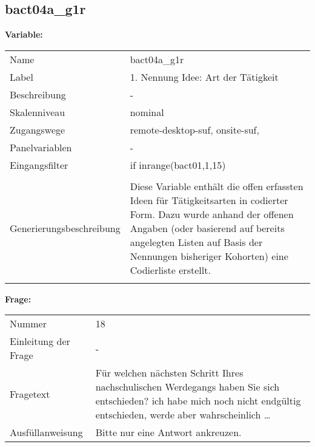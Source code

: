 	
	
	\subsection{bact04a\_g1r}
	\label{subSection:bact04a_g1r}

	\noindent\textbf{Variable:}\\
		\begin{tabular}{lL{11.3cm}}
			\label{tableVariable:bact04a_g1r}
			Name & bact04a\_g1r \\
			Label & 1. Nennung Idee: Art der Tätigkeit \\
			Beschreibung & - \\
			Skalenniveau & nominal \\
			Zugangswege &
				remote-desktop-suf,
				onsite-suf,
 \\
			Panelvariablen & -
			 \\
			Eingangsfilter & if inrange(bact01,1,15) \\
 \\
					Generierungsbeschreibung & Diese Variable enthält die offen erfassten Ideen für Tätigkeitsarten in codierter Form. Dazu wurde anhand der offenen Angaben (oder basierend auf bereits angelegten Listen auf Basis der Nennungen bisheriger Kohorten) eine Codierliste erstellt.
				 \\	
			 \\
		\end{tabular}

		\vspace*{1 cm}
		\noindent\textbf{Frage:}\\
		\begin{tabular}{lL{11.3cm}}
			\label{tableQuestion:bact04a_g1r}
			Nummer & 18 \\
			Einleitung der Frage & - \\
			Fragetext & Für welchen nächsten Schritt Ihres nachschulischen Werdegangs haben Sie sich entschieden?
ich habe mich noch nicht endgültig entschieden, werde aber wahrscheinlich … \\
			Ausfüllanweisung & Bitte nur eine Antwort ankreuzen. \\
		\end{tabular}





